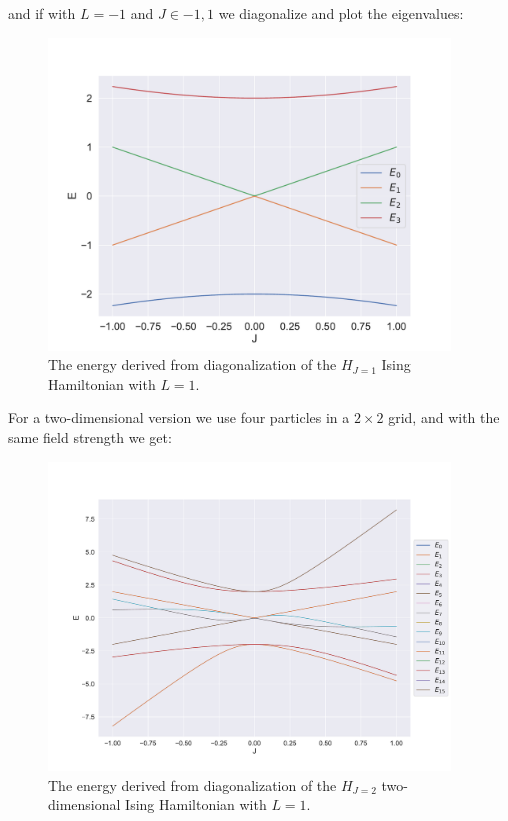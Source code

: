 and if with $L=-1$ and $J \in {-1, 1}$ we diagonalize and plot the eigenvalues:

\begin{figure}[H]
  \begin{center}
    \includegraphics[width=0.95\textwidth]{Figures/Plots/Ising/ising_diag.pdf}
  \end{center}
  \caption{The energy derived from diagonalization of the $H_{J=1}$ Ising Hamiltonian with $L = 1$.}

\end{figure}

For a two-dimensional version we use four particles in a $2\times2$ grid, and with the same field strength we get:


\begin{figure}[H]
  \begin{center}
    \includegraphics[width=0.95\textwidth]{Figures/Plots/Ising/ising_diag_42.pdf}
  \end{center}
  \caption{The energy derived from diagonalization of the $H_{J=2}$ two-dimensional Ising Hamiltonian with $L = 1$.}
\end{figure}

